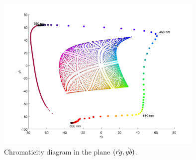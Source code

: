 \begin{figure}[h]
\centering
\includegraphics[width=10cm]{chap_chromaticity.png}
\caption{Chromaticity diagram in the plane $(\mathop{\hat{rg}}\nolimits,\mathop{\hat{yb}}\nolimits)$.}
\label{fig:rgyb}
\end{figure}
